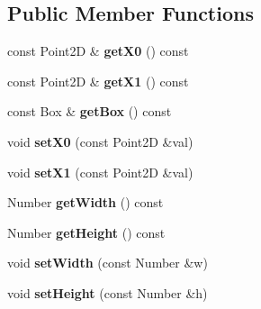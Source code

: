 \subsection*{Public Member Functions}
\begin{DoxyCompactItemize}
\item 
\hypertarget{classsambag_1_1com_1_1_rectangle_ae403682bc1da6e1e3a9cbcdb154e2fe9}{
const Point2D \& {\bfseries getX0} () const }
\label{classsambag_1_1com_1_1_rectangle_ae403682bc1da6e1e3a9cbcdb154e2fe9}

\item 
\hypertarget{classsambag_1_1com_1_1_rectangle_a9ebdb3d531b4c810b19c74483c93940c}{
const Point2D \& {\bfseries getX1} () const }
\label{classsambag_1_1com_1_1_rectangle_a9ebdb3d531b4c810b19c74483c93940c}

\item 
\hypertarget{classsambag_1_1com_1_1_rectangle_a4732e12080ad399982649301668a4f0b}{
const Box \& {\bfseries getBox} () const }
\label{classsambag_1_1com_1_1_rectangle_a4732e12080ad399982649301668a4f0b}

\item 
\hypertarget{classsambag_1_1com_1_1_rectangle_a05fc68a27fa256773363ddb82aec091a}{
void {\bfseries setX0} (const Point2D \&val)}
\label{classsambag_1_1com_1_1_rectangle_a05fc68a27fa256773363ddb82aec091a}

\item 
\hypertarget{classsambag_1_1com_1_1_rectangle_a821b8020a8a63edf7b45d234ec50fcbd}{
void {\bfseries setX1} (const Point2D \&val)}
\label{classsambag_1_1com_1_1_rectangle_a821b8020a8a63edf7b45d234ec50fcbd}

\item 
\hypertarget{classsambag_1_1com_1_1_rectangle_ab987cd1f4e2582e22cf2e7c81a340343}{
Number {\bfseries getWidth} () const }
\label{classsambag_1_1com_1_1_rectangle_ab987cd1f4e2582e22cf2e7c81a340343}

\item 
\hypertarget{classsambag_1_1com_1_1_rectangle_ac1b141e8781333c77332efbe655c8c8b}{
Number {\bfseries getHeight} () const }
\label{classsambag_1_1com_1_1_rectangle_ac1b141e8781333c77332efbe655c8c8b}

\item 
\hypertarget{classsambag_1_1com_1_1_rectangle_a10eaf05addcd75bc6c1cd792b46f6409}{
void {\bfseries setWidth} (const Number \&w)}
\label{classsambag_1_1com_1_1_rectangle_a10eaf05addcd75bc6c1cd792b46f6409}

\item 
\hypertarget{classsambag_1_1com_1_1_rectangle_a0046f190f16a5444f9d2419171585a7d}{
void {\bfseries setHeight} (const Number \&h)}
\label{classsambag_1_1com_1_1_rectangle_a0046f190f16a5444f9d2419171585a7d}


\end{DoxyCompactItemize}
